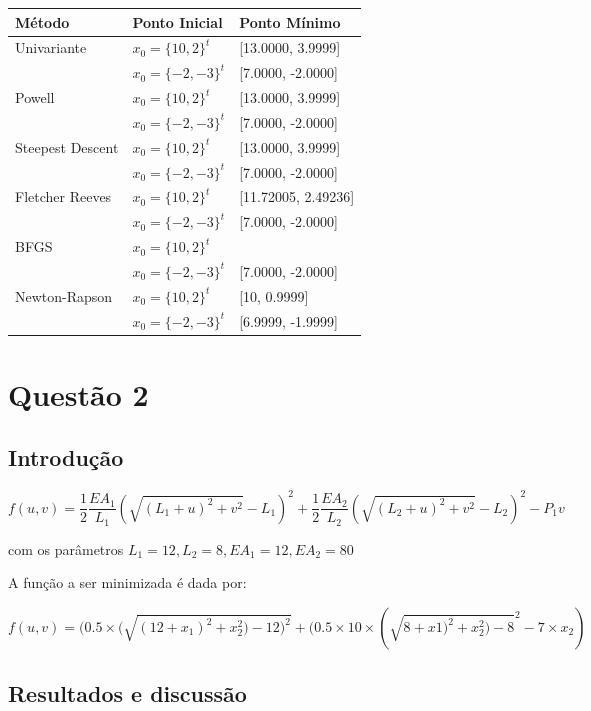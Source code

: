 \documentclass[12pt]{article}
\begin{document}
\begin{table}[H]
  \centering
  \begin{tabular}{lll}
    \hline
    \textbf{Método} & \textbf{Ponto Inicial} & \textbf{Ponto Mínimo} \\\hline
    Univariante & $x_{0} =\{10,2\}^{t}$ & [13.0000, 3.9999]\\
     & $x_{0}=\{-2,-3\}^{t}$ & [7.0000, -2.0000] \\\hline 
    Powell & $x_{0} =\{10,2\}^{t}$ & [13.0000, 3.9999] \\
     & $x_{0}=\{-2,-3\}^{t}$ & [7.0000, -2.0000] \\\hline 
    Steepest Descent & $x_{0} =\{10,2\}^{t}$ & [13.0000, 3.9999] \\
     & $x_{0}=\{-2,-3\}^{t}$ & [7.0000, -2.0000] \\\hline 
  Fletcher Reeves & $x_{0} =\{10,2\}^{t}$ & [11.72005, 2.49236]\\
     & $x_{0}=\{-2,-3\}^{t}$ & [7.0000, -2.0000] \\\hline 
    BFGS & $x_{0} =\{10,2\}^{t}$ & \\
     & $x_{0}=\{-2,-3\}^{t}$ & [7.0000, -2.0000] \\\hline 
    Newton-Rapson & $x_{0} =\{10,2\}^{t}$ & [10, 0.9999]\\
     & $x_{0}=\{-2,-3\}^{t}$ & [6.9999, -1.9999]\\\hline 
  \end{tabular}
\end{table}


\section*{Questão 2} 

\subsection*{Introdução}

$$f(u, v) = \frac{1}{2}\frac{EA_{1}}{L_{1}}(\sqrt{(L_{1}+u)^{2}+v^{2}}-L_{1})^{2}+\frac{1}{2}\frac{EA_{2}}{L_{2}}(\sqrt{(L_{2}+u)^{2}+v^{2}}-L_{2})^{2}-P_{1}v$$

\noindent com os parâmetros $L_{1}=12, L_{2}=8, EA_{1}=12, EA_{2}=80$

A função a ser minimizada é dada por:

$$f(u,v) = (0.5\times(\sqrt{(12+x_{1})^2+x_{2}^2)-12)^2}+(0.5\times10\times(\sqrt{8+x1)^2+x_{2}^2)-8}^2-7\times x_{2})$$

\subsection*{Resultados e discussão}
\end{document}
